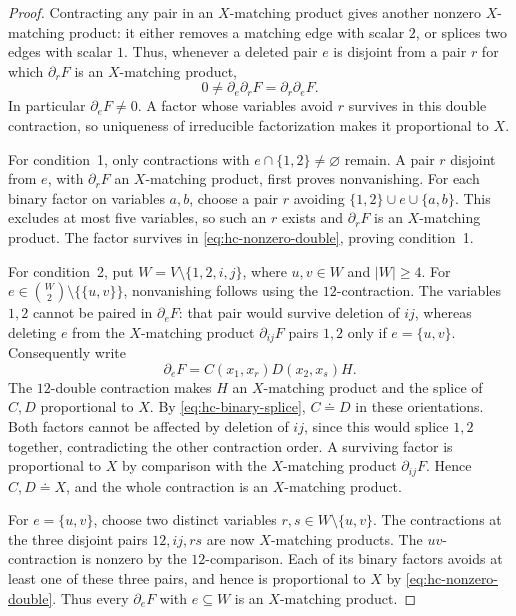 \documentclass[11pt,letterpaper,onecolumn]{article}
\theoremstyle{plain}
\theoremstyle{definition}
\theoremstyle{remark}
\begin{document}
	\begin{proof}
		Contracting any pair in an \(X\)-matching product gives another nonzero
		\(X\)-matching product: it either removes a matching edge with scalar
		\(2\), or splices two edges with scalar \(1\).  Thus, whenever a deleted
		pair \(e\) is disjoint from a pair \(r\) for which
		\(\partial_rF\) is an \(X\)-matching product,
		\begin{equation}
		0\ne\partial_e\partial_rF=\partial_r\partial_eF.
		\label{eq:hc-nonzero-double}
		\end{equation}
		In particular \(\partial_eF\ne0\).  A factor whose variables avoid \(r\)
		survives in this double contraction, so uniqueness of irreducible factorization makes it proportional to \(X\).
		
		For condition~1, only contractions with \(e\cap\{1,2\}\ne\varnothing\)
		remain.  A pair \(r\) disjoint from \(e\), with \(\partial_rF\) an
		\(X\)-matching product, first proves nonvanishing.
		For each binary factor on variables \(a,b\), choose a pair \(r\) avoiding
		\(\{1,2\}\cup e\cup\{a,b\}\).  This excludes at most five variables, so such
		an \(r\) exists and \(\partial_rF\) is an \(X\)-matching product.  The factor survives in
		\eqref{eq:hc-nonzero-double}, proving condition~1.
		
		For condition~2, put \(W=V\setminus\{1,2,i,j\}\), where
		\(u,v\in W\) and \(|W|\ge4\).  For
		\(e\in\binom W2\setminus\{\{u,v\}\}\), nonvanishing follows using the
		\(12\)-contraction.  The variables \(1,2\) cannot be paired in \(\partial_eF\):
		that pair would survive deletion of \(ij\), whereas deleting \(e\) from
		the \(X\)-matching product \(\partial_{ij}F\) pairs \(1,2\) only if \(e=\{u,v\}\).
		Consequently write
		\[
		\partial_eF=C(x_1,x_r)D(x_2,x_s)H.
		\]
		The \(12\)-double contraction makes \(H\) an \(X\)-matching product and the splice of
		\(C,D\) proportional to \(X\).  By \eqref{eq:hc-binary-splice},
		\(C\doteq D\) in these orientations.
		Both factors cannot be affected by deletion of \(ij\), since this would
		splice \(1,2\) together, contradicting the other contraction order.
		A surviving factor is proportional to \(X\) by comparison with the
		\(X\)-matching product \(\partial_{ij}F\).  Hence \(C,D\doteq X\), and the whole contraction is an
		\(X\)-matching product.
		
		For \(e=\{u,v\}\), choose two distinct variables \(r,s\in W\setminus\{u,v\}\).
		The contractions at the three disjoint pairs \(12,ij,rs\) are now
		\(X\)-matching products.
		The \(uv\)-contraction is nonzero by the \(12\)-comparison.  Each of its binary
		factors avoids at least one of these three pairs, and hence is
		proportional to \(X\) by \eqref{eq:hc-nonzero-double}.
		Thus every \(\partial_eF\) with \(e\subseteq W\) is an
		\(X\)-matching product.
		

\end{proof}
\end{document}
